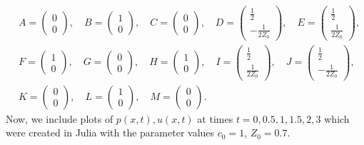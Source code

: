 \documentclass{article}
\begin{document}
\begin{align*}
&A=\begin{pmatrix}
	0\\0
\end{pmatrix},\quad B=\begin{pmatrix}
1\\0
\end{pmatrix},\quad C=\begin{pmatrix}
0\\0
\end{pmatrix},\quad D=\begin{pmatrix}
\frac{1}{2}\\-\frac{1}{2Z_0}
\end{pmatrix},\quad E=\begin{pmatrix}
\frac{1}{2}\\\frac{1}{2Z_0}
\end{pmatrix},\\
&F=\begin{pmatrix}
1\\0
\end{pmatrix},\quad G=\begin{pmatrix}
	0\\0
\end{pmatrix},\quad H=\begin{pmatrix}
1\\0
\end{pmatrix},\quad I=\begin{pmatrix}
\frac{1}{2}\\\frac{1}{2Z_0}
\end{pmatrix},\quad J=\begin{pmatrix}
\frac{1}{2}\\-\frac{1}{2Z_0}
\end{pmatrix},\\
&K=\begin{pmatrix}
0\\0
\end{pmatrix},\quad L=\begin{pmatrix}
1\\0
\end{pmatrix},\quad M=\begin{pmatrix}
0\\0
\end{pmatrix}.
\end{align*}
Now, we include plots of $p(x,t),u(x,t)$ at times $t=0,0.5,1,1.5,2,3$ which were created in Julia with the parameter values $c_0=1$, $Z_0=0.7$.\\
\end{document}
